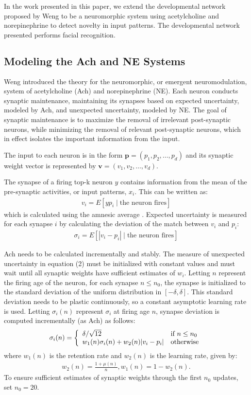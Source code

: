 \documentclass[conference]{IEEEtran}
\begin{document}
In the work presented in this paper, we extend the developmental network proposed by Weng \cite{WengNAI12} to be a neuromorphic system using acetylcholine and norepinephrine to detect novelty in input patterns. The developmental network presented performs facial recognition.  

\subsection{Modeling the Ach and NE Systems}
Weng \cite{WengNAI12} introduced the theory for the neuromorphic, or emergent neuromodulation, system of acetylcholine (Ach) and norepinephrine (NE). Each neuron conducts synaptic maintenance, maintaining its synapses based on expected uncertainty, modeled by Ach, and unexpected uncertainty, modeled by NE. The goal of synaptic maintenance is to maximize the removal of irrelevant post-synaptic neurons, while minimizing the removal of relevant post-synaptic neurons, which in effect isolates the important information from the input.

The input to each neuron is in the form $\mathbf{p}=(p_1,p_2,\dots,p_d)$ and its synaptic weight vector is represented by $\mathbf{v}=(v_1,v_2,\dots,v_d)$.

The synapse of a firing top-k neuron $y$ contains information from the mean of the pre-synaptic activities, or input patterns, $x_i$. This can be written as:
\begin{align}v_i=E[yp_i\; | \;\text{the neuron fires}] \end{align}
which is calculated using the amnesic average \cite{WengNAI12}. Expected uncertainty is measured for each synapse $i$ by calculating the deviation of the match between $v_i$ and $p_i$:
\begin{align}\sigma_i=E[|v_i-p_i|\;|\;\text{the neuron fires}]\end{align}

Ach needs to be calculated incrementally and stably. The measure of unexpected uncertainty in equation (2) must be initialized with constant values and must wait until all synaptic weights have sufficient estimates of $w_i$. Letting $n$ represent the firing age of the neuron, for each synapse $n \le n_0$, the synapse is initialized to the standard deviation of the uniform distribution in $[-\delta,\delta]$. This standard deviation needs to be plastic continuously, so a constant asymptotic learning rate is used. Letting $\sigma_i(n)$ represent $\sigma_i$ at firing age $n$, synapse deviation is computed incrementally (as Ach) as follows:
\begin{align}\sigma_i(n)=\left\{
\begin{array}{l l}
\delta/\sqrt{12} &\text{if $n \le n_0$}\\
w_1(n)\sigma_i(n)+w_2(n)|v_i-p_i| & \text{otherwise}
\end{array}\right.\end{align}
where $w_1(n)$ is the retention rate and $w_2(n)$ is the learning rate, given by:
\begin{align}w_2(n)=\frac{1+\mu(n)}{n},w_1(n)=1-w_2(n). \nonumber 
\end{align}
To ensure sufficient estimates of synaptic weights through the first $n_0$ updates, set $n_0=20$. 
\end{document}
